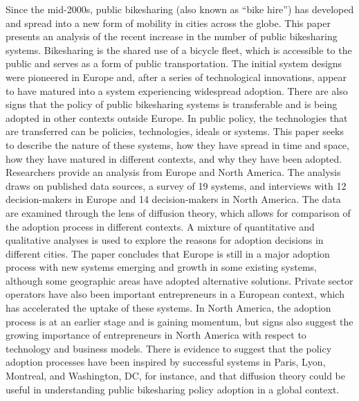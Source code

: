 Since the mid-2000s, public bikesharing (also known as “bike hire”) has developed and spread into a new form of mobility in cities across the globe. This paper presents an analysis of the recent increase in the number of public bikesharing systems. Bikesharing is the shared use of a bicycle fleet, which is accessible to the public and serves as a form of public transportation. The initial system designs were pioneered in Europe and, after a series of technological innovations, appear to have matured into a system experiencing widespread adoption. There are also signs that the policy of public bikesharing systems is transferable and is being adopted in other contexts outside Europe. In public policy, the technologies that are transferred can be policies, technologies, ideals or systems. This paper seeks to describe the nature of these systems, how they have spread in time and space, how they have matured in different contexts, and why they have been adopted. Researchers provide an analysis from Europe and North America. The analysis draws on published data sources, a survey of 19 systems, and interviews with 12 decision-makers in Europe and 14 decision-makers in North America. The data are examined through the lens of diffusion theory, which allows for comparison of the adoption process in different contexts. A mixture of quantitative and qualitative analyses is used to explore the reasons for adoption decisions in different cities. The paper concludes that Europe is still in a major adoption process with new systems emerging and growth in some existing systems, although some geographic areas have adopted alternative solutions. Private sector operators have also been important entrepreneurs in a European context, which has accelerated the uptake of these systems. In North America, the adoption process is at an earlier stage and is gaining momentum, but signs also suggest the growing importance of entrepreneurs in North America with respect to technology and business models. There is evidence to suggest that the policy adoption processes have been inspired by successful systems in Paris, Lyon, Montreal, and Washington, DC, for instance, and that diffusion theory could be useful in understanding public bikesharing policy adoption in a global context.